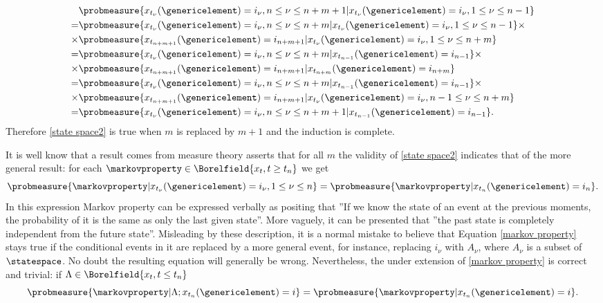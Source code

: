 \begin{equation}
    \begin{aligned}
        \ & \probmeasure\{x_{t_\nu}(\genericelement)=i_\nu, n\leq \nu \leq n+m+1|x_{t_\nu}(\genericelement)=i_\nu, 1\leq \nu \leq n-1\} \\
        =& \probmeasure\{x_{t_\nu}(\genericelement)=i_\nu, n\leq \nu \leq n+m|x_{t_\nu}(\genericelement)=i_\nu, 1\leq \nu \leq n-1\} \times \\
        \times & \probmeasure\{x_{t_{n+m+1}}(\genericelement)=i_{n+m+1}|x_{t_\nu}(\genericelement)=i_\nu, 1\leq \nu \leq n+m\} \\
        =& \probmeasure\{x_{t_\nu}(\genericelement)=i_\nu, n\leq \nu \leq n+m|x_{t_{n-1}}(\genericelement)=i_{n-1}\} \times \\
        \times & \probmeasure\{x_{t_{n+m+1}}(\genericelement)=i_{n+m+1}|x_{t_{n+m}}(\genericelement)=i_{n+m}\} \\
        =& \probmeasure\{x_{t_\nu}(\genericelement)=i_\nu, n\leq \nu \leq n+m|x_{t_{n-1}}(\genericelement)=i_{n-1}\} \times \\
        \times & \probmeasure\{x_{t_{n+m+1}}(\genericelement)=i_{n+m+1}|x_{t_{\nu}}(\genericelement)=i_{\nu}, n - 1\leq \nu \leq n+m\} \\
        =& \probmeasure\{x_{t_\nu}(\genericelement)=i_\nu, n\leq \nu \leq n+m+1|x_{t_{n-1}}(\genericelement)=i_{n-1}\}.
    \end{aligned}
\end{equation} 
Therefore \ref{state space2} is true when $m$ is replaced by $m+1$ and the induction is complete.

It is well know that a result comes from measure theory asserts that for all $m$ the validity of \ref{state space2} indicates that of the more general result: for each $\markovproperty \in \Borelfield \{x_t, t\geq t_n\}$ we get
\begin{equation}
    \probmeasure \{\markovproperty | x_{t_\nu}(\genericelement) = i_\nu, 1\leq \nu \leq n\} = \probmeasure \{\markovproperty | x_{t_n}(\genericelement)= i_n\}.
    \label{markov property}
\end{equation}
In this expression Markov property can be expressed verbally as positing that ''If we know the state of an event at the previous moments, the probability of it is the same as only the last given state''. More vaguely, it can be presented that ''the past state is completely independent from the future state''. Misleading by these description, it is a normal mistake to believe that Equation \ref{markov property} stays true if the conditional events in it are replaced by a more general event, for instance, replacing $i_\nu$ with $A_\nu$, where $A_\nu$ is a subset of $\statespace$. No doubt the resulting equation will generally be wrong. Nevertheless, the under extension of \ref{markov property} is correct and trivial: if $\Lambda \in \Borelfield\{x_t,t\leq t_n\}$
\begin{equation}
    \probmeasure \{\markovproperty | \Lambda ; x_{t_n}(\genericelement)= i \} = \probmeasure\{\markovproperty |x_{t_n}(\genericelement)= i\}.
\end{equation}

